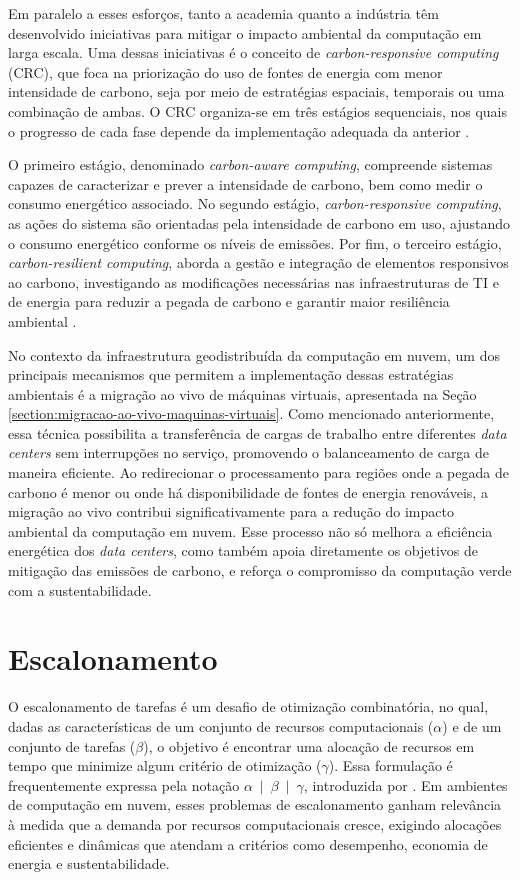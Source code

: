 \documentclass[
	12pt,				%
	oneside,			%
	a4paper,			%
	english,			%
	brazil				%
	]{abntex2ppgsi}
\begin{document}
Em paralelo a esses esforços, tanto a academia quanto a indústria têm desenvolvido iniciativas para mitigar o impacto ambiental da computação em larga escala. Uma dessas iniciativas é o conceito de \textit{carbon-responsive computing} (CRC), que foca na priorização do uso de fontes de energia com menor intensidade de carbono, seja por meio de estratégias espaciais, temporais ou uma combinação de ambas. O CRC organiza-se em três estágios sequenciais, nos quais o progresso de cada fase depende da implementação adequada da anterior \cite{en14216917}.

O primeiro estágio, denominado \textit{carbon-aware computing}, compreende sistemas capazes de caracterizar e prever a intensidade de carbono, bem como medir o consumo energético associado. No segundo estágio, \textit{carbon-responsive computing}, as ações do sistema são orientadas pela intensidade de carbono em uso, ajustando o consumo energético conforme os níveis de emissões. Por fim, o terceiro estágio, \textit{carbon-resilient computing}, aborda a gestão e integração de elementos responsivos ao carbono, investigando as modificações necessárias nas infraestruturas de TI e de energia para reduzir a pegada de carbono e garantir maior resiliência ambiental \cite{en14216917}.

No contexto da infraestrutura geodistribuída da computação em nuvem, um dos principais mecanismos que permitem a implementação dessas estratégias ambientais é a migração ao vivo de máquinas virtuais, apresentada na Seção \ref{section:migracao-ao-vivo-maquinas-virtuais}. Como mencionado anteriormente, essa técnica possibilita a transferência de cargas de trabalho entre diferentes \textit{data centers} sem interrupções no serviço, promovendo o balanceamento de carga de maneira eficiente. Ao redirecionar o processamento para regiões onde a pegada de carbono é menor ou onde há disponibilidade de fontes de energia renováveis, a migração ao vivo contribui significativamente para a redução do impacto ambiental da computação em nuvem. Esse processo não só melhora a eficiência energética dos \textit{data centers}, como também apoia diretamente os objetivos de mitigação das emissões de carbono, e reforça o compromisso da computação verde com a sustentabilidade.

\section{Escalonamento}\label{section:escalonamento}

O escalonamento de tarefas é um desafio de otimização combinatória, no qual, dadas as características de um conjunto de recursos computacionais ($\alpha$) e de um conjunto de tarefas ($\beta$), o objetivo é encontrar uma alocação de recursos em tempo que minimize algum critério de otimização ($\gamma$). Essa formulação é frequentemente expressa pela notação \mbox{$\alpha$ $\vert$ $\beta$ $\vert$ $\gamma$}, introduzida por . Em ambientes de computação em nuvem, esses problemas de escalonamento ganham relevância à medida que a demanda por recursos computacionais cresce, exigindo alocações eficientes e dinâmicas que atendam a critérios como desempenho, economia de energia e sustentabilidade.
\end{document}
